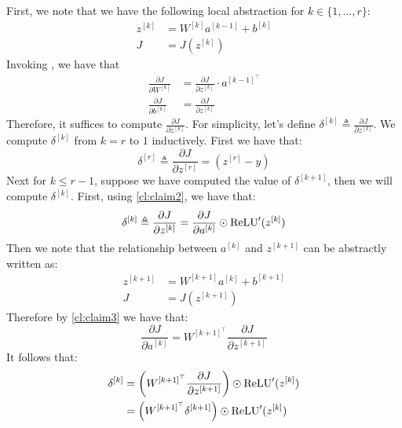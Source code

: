 First, we note that we have the following local abstraction for $k \in
\{1,\ldots,r\}$:
\begin{align*}
    z^{[k]} &= W^{[k]} a^{[k-1]} + b^{[k]}\\
    J &= J(z^{[k]})
\end{align*}
Invoking , we have that
\begin{align}
    \frac{\partial J}{\partial W^{[k]}} &= \frac{\partial J}{\partial z^{[k]}} \cdot a^{[k-1]^\top}\\
    \frac{\partial J}{\partial b^{[k]}} &= \frac{\partial J}{\partial z^{[k]}}
\end{align}
Therefore, it suffices to compute
$\frac{\partial J}{\partial z^{[k]}}$. For simplicity, let's define $\delta^{[k]} \triangleq \frac{\partial J}{\partial z^{[k]}}$.
We compute $\delta^{[k]}$ from $k = r$ to $1$ inductively. First we have that:
\begin{equation}
    \delta^{[r]} \triangleq \frac{\partial J}{\partial z^{[r]}} = (z^{[r]} - y)
\end{equation}
Next for $k \le r - 1$, suppose we have computed the value of $\delta^{[k+1]}$, then we
will compute $\delta^{[k]}$. First, using \cref{cl:claim2}, we have that:
\begin{equation}
    \delta^{[k]} \triangleq \frac{\partial J}{\partial z^{[k]}} = \frac{\partial J}{\partial a^{[k]}} \odot \operatorname{ReLU}'(z^{[k]})
\end{equation}
Then we note that the relationship between $a^{[k]}$ and $z^{[k+1]}$ can be abstractly
written as:
\begin{align}
    z^{[k+1]} &= W^{[k+1]} a^{[k]} + b^{[k+1]}\\
    J &= J(z^{[k+1]})
\end{align}
Therefore by \cref{cl:claim3} we have that:
\begin{equation}
    \frac{\partial J}{\partial a^{[k]}} = W^{[k+1]^\top}\frac{\partial J}{\partial z^{[k+1]}}
\end{equation}
It follows that:
\begin{align*}
    \delta^{[k]} &= \left(W^{[k+1]^\top}\frac{\partial J}{\partial z^{[k+1]}}\right) \odot \operatorname{ReLU}'(z^{[k]})\\
        &= \left(W^{[k+1]^\top} \delta^{[k+1]} \right) \odot \operatorname{ReLU}'(z^{[k]})
\end{align*}


